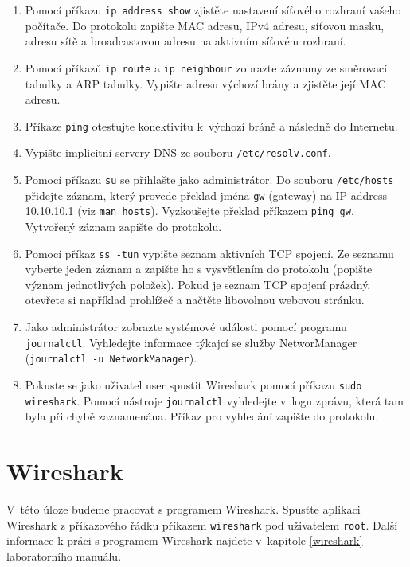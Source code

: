 \documentclass[a4paper,11pt]{article}
\begin{document}
\begin{enumerate}
  \item Pomocí příkazu {\tt ip address show} zjistěte nastavení síťového rozhraní vašeho počítače. Do protokolu zapište MAC adresu, IPv4 adresu, síťovou masku, adresu sítě a broadcastovou adresu na aktivním síťovém rozhraní.
  \item Pomocí příkazů {\tt ip route} a {\tt ip neighbour} zobrazte záznamy ze směrovací tabulky a ARP tabulky. Vypište adresu výchozí brány a zjistěte její MAC adresu. 
  \item Příkaze {\tt ping} otestujte konektivitu k~výchozí bráně a následně do Internetu. 
  \item Vypište implicitní servery DNS ze souboru {\tt /etc/resolv.conf}.
  \item Pomocí příkazu {\tt su} se přihlašte jako administrátor. Do souboru {\tt /etc/hosts} přidejte záznam, který provede překlad jména {\tt gw} (gateway) na IP address 10.10.10.1 (viz {\tt man hosts}). Vyzkoušejte překlad příkazem {\tt ping gw}. Vytvořený záznam zapište do protokolu. 
  \item Pomocí příkaz {\tt ss -tun} vypište seznam aktivních TCP spojení. Ze seznamu vyberte jeden záznam a zapište ho s vysvětlením do protokolu (popište význam jednotlivých položek). Pokud je seznam TCP spojení prázdný, otevřete si například prohlížeč a načtěte libovolnou webovou stránku. 
  \item Jako administrátor zobrazte systémové události pomocí programu \texttt{journalctl}. Vyhledejte informace týkajcí se služby NetworManager ({\tt journalctl -u NetworkManager}).  
  \item Pokuste se jako uživatel user spustit Wireshark pomocí příkazu \texttt{sudo wireshark}. Pomocí nástroje {\tt journalctl} vyhledejte v~logu zprávu, která tam byla při chybě zaznamenána. Příkaz pro vyhledání zapište do protokolu. 
\end{enumerate}

\section{Wireshark}
V~této úloze budeme pracovat s programem Wireshark. Spusťte aplikaci Wireshark z příkazového řádku příkazem \texttt{wireshark}
pod uživatelem \texttt{root}. Další informace k práci s programem Wireshark najdete v~kapitole \ref{wireshark} laboratorního manuálu. 
\end{document}
